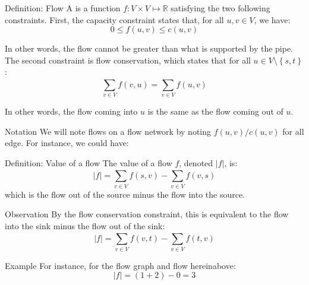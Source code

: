 \documentclass[a4paper]{article}
\begin{document}
\begin{parag}{Definition: Flow}
    A  is a function $f: V \times V \mapsto \mathbb{R}$ satisfying the two following constraints. First, the capacity constraint states that, for all $u, v \in V$, we have: 
    \[0 \leq f\left(u, v\right) \leq c\left(u, v\right)\]
    
    In other words, the flow cannot be greater than what is supported by the pipe. The second constraint is flow conservation, which states that for all $u \in V \setminus \left\{s, t\right\}$: 
    \[\sum_{v \in V}^{} f\left(v, u\right) = \sum_{v \in V}^{} f\left(u, v\right)\]
    
    In other words, the flow coming into $u$ is the same as the flow coming out of $u$.

    \begin{subparag}{Notation}
        We will note flows on a flow network by noting $f\left(u, v\right) / c\left(u, v\right)$ for all edge. For instance, we could have:
    \end{subparag}
\end{parag}

\begin{parag}{Definition: Value of a flow}
    The value of a flow $f$, denoted $\left|f\right|$, is: 
    \[\left|f\right| = \sum_{v \in V}^{} f\left(s, v\right) - \sum_{v \in V}^{} f\left(v, s\right)\]
    which is the flow out of the source minus the flow into the source.

    \begin{subparag}{Observation}
        By the flow conservation constraint, this is equivalent to the flow into the sink minus the flow out of the sink:
        \[\left|f\right| = \sum_{v \in V}^{} f\left(v, t\right) - \sum_{v \in V}^{} f\left(t, v\right)\]
    \end{subparag}

    \begin{subparag}{Example}
        For instance, for the flow graph and flow hereinabove:
        \[\left|f\right| = \left(1 + 2\right) - 0 = 3\]
    \end{subparag}
\end{parag}
\end{document}

